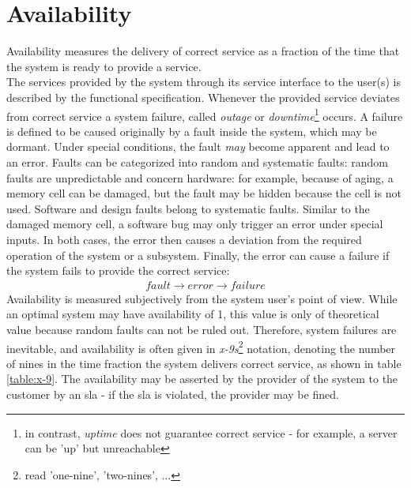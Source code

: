 \section{Availability}

Availability measures the delivery of correct service as a fraction of the time that the system is ready to provide a service. 
\\
The services provided by the system through its service interface to the user(s) 
is described by the functional specification. Whenever the provided service
deviates from correct service a system failure, called \textit{outage} or \textit{downtime}\footnote{in contrast, \textit{uptime} does not guarantee correct
service - for example, a server can be 'up' but unreachable} occurs. A failure is defined to be caused originally by a fault inside the system, which may be 
dormant. Under special conditions, the fault \textit{may} become apparent and lead to an error. Faults can be categorized into random and systematic faults:
random faults are unpredictable and concern hardware: for example, because of aging, a memory cell can be damaged, but the fault may be hidden because the cell
is not used. Software and design faults belong to systematic faults. Similar to the damaged memory cell, a software bug may only 
trigger an error under special inputs. In both cases, the error then causes a deviation from the required operation of the system or a subsystem. Finally, the 
error can cause a failure if the system fails to provide the correct service:
\begin{align*}
 fault \rightarrow error \rightarrow failure
\end{align*}
Availability is measured subjectively from the system user's point of view.
While an optimal system may have availability of 1, this value is only of theoretical value because random faults can not be ruled out. Therefore,
system failures are inevitable, and availability is often given in \textit{x-9s}\footnote{read 'one-nine', 'two-nines', ...} notation, denoting the 
number of nines in the time fraction the system delivers correct service, as shown in table \ref{table:x-9}.
The availability may be asserted by the provider of the system to the customer by an
\gls{sla} - if the \gls{sla} is violated, the provider may be fined.
